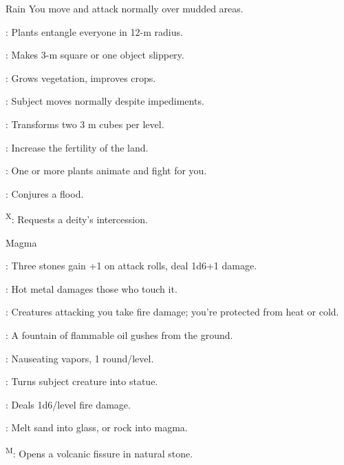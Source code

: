 {Rain}
{You move and attack normally over mudded areas.}
{
	\item {}: Plants entangle everyone in 12-m radius.
	\item {}: Makes 3-m square or one object slippery.
	\item {}: Grows vegetation, improves crops.
	\item {}: Subject moves normally despite impediments.
	\item {}: Transforms two 3 m cubes per level.
	\item {}: Increase the fertility of the land.
	\item {}: One or more plants animate and fight for you.
	\item {}: Conjures a flood.
	\item {}\textsuperscript{X}: Requests a deity's intercession.
}

{Magma}
{}
{
	\item {}: Three stones gain +1 on attack rolls, deal 1d6+1 damage.
	\item {}: Hot metal damages those who touch it.
	\item {}: Creatures attacking you take fire damage; you’re protected from heat or cold.
	\item {}: A fountain of flammable oil gushes from the ground.
	\item {}: Nauseating vapors, 1 round/level.
	\item {}: Turns subject creature into statue.
	\item {}: Deals 1d6/level fire damage.
	\item {}: Melt sand into glass, or rock into magma.
	\item {}\textsuperscript{M}: Opens a volcanic fissure in natural stone.
}

